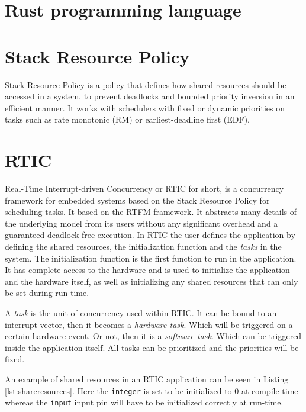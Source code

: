 \section{Rust programming language}

\section{Stack Resource Policy}
Stack Resource Policy\cite{srp} is a policy that defines how shared resources
should be accessed in a system, to prevent deadlocks and bounded priority
inversion in an efficient manner. It works with schedulers with fixed or
dynamic priorities on tasks such as rate monotonic (RM) or earliest-deadline
first (EDF). 

\section{RTIC}
Real-Time Interrupt-driven Concurrency or RTIC for short, is a concurrency
framework for embedded systems based on the Stack Resource Policy for
scheduling tasks. It based on the RTFM framework\cite{rtfm}. It abstracts many
details of the underlying model from its users without any significant overhead
and a guaranteed deadlock-free execution. In RTIC the user defines the
application by defining the shared resources, the initialization function and
the \emph{tasks} in the system. The initialization function is the first
function to run in the application. It has complete access to the hardware and
is used to initialize the application and the hardware itself, as well as
initializing any shared resources that can only be set during run-time.

A \emph{task} is the unit of concurrency used within RTIC. It can be bound to
an interrupt vector, then it becomes a \emph{hardware task}. Which will be
triggered on a certain hardware event. Or not, then it is a \emph{software
task}. Which can be triggered inside the application itself. All tasks can be
prioritized and the priorities will be fixed.

An example of shared resources in an RTIC application can be seen in Listing
\ref{lst:shareresources}. Here the \texttt{integer} is set to be initialized to
$0$ at compile-time whereas the \texttt{input} input pin will have to be initialized
correctly at run-time.


